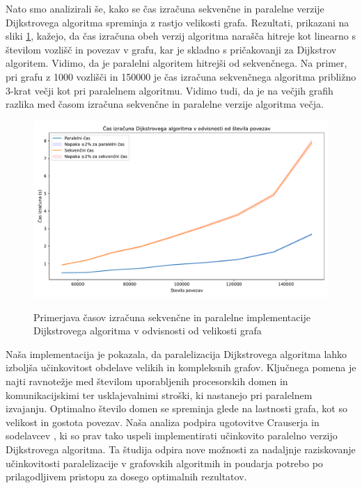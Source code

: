 \documentclass[mat1, tisk]{fmfdelo}
\begin{document}
Nato smo analizirali še, kako se čas izračuna sekvenčne in paralelne verzije Dijkstrovega algoritma spreminja z rastjo
velikosti grafa. Rezultati, prikazani na sliki \ref{fig:dijkstra_calculation_time_by_graph_size}, kažejo, da čas izračuna
obeh verzij algoritma narašča hitreje kot linearno s številom vozlišč in povezav v grafu, kar je skladno s pričakovanji
za Dijkstrov algoritem. Vidimo, da je paralelni algoritem hitrejši od sekvenčnega. Na primer, pri grafu z 1000 vozlišči
in 150000 je čas izračuna sekvenčnega algoritma približno 3-krat večji kot pri paralelnem algoritmu. Vidimo tudi, da je
na večjih grafih razlika med časom izračuna sekvenčne in paralelne verzije algoritma večja.  

\begin{figure}[h!]
  \centering
  \caption{Primerjava časov izračuna sekvenčne in paralelne implementacije Dijkstrovega algoritma v odvisnosti od velikosti grafa}
  \includegraphics[width=15cm]{slike/dijkstra_v_odvisnosti_od_velikosti_grafa.pdf}
  \label{fig:dijkstra_calculation_time_by_graph_size}
\end{figure}

Naša implementacija je pokazala, da paralelizacija Dijkstrovega algoritma lahko izboljša učinkovitost obdelave velikih
in kompleksnih grafov. Ključnega pomena je najti ravnotežje med številom uporabljenih procesorskih domen in
komunikacijskimi ter usklajevalnimi stroški, ki nastanejo pri paralelnem izvajanju. Optimalno število domen se spreminja
glede na lastnosti grafa, kot so velikost in gostota povezav. Naša analiza podpira ugotovitve Crauserja in
sodelavcev \cite{crauser1998parallelizing}, ki so prav tako uspeli implementirati učinkovito paralelno verzijo Dijkstrovega algoritma.
Ta študija odpira nove možnosti za nadaljnje raziskovanje učinkovitosti paralelizacije v grafovskih algoritmih in
poudarja potrebo po prilagodljivem pristopu za dosego optimalnih rezultatov.
\end{document}
